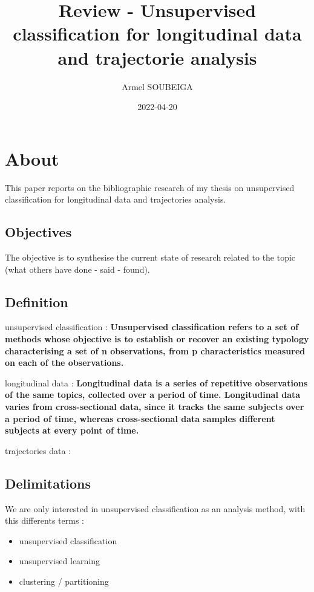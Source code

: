 \documentclass[
]{book}
\title{Review - Unsupervised classification for longitudinal data and trajectorie analysis}
\author{Armel SOUBEIGA}
\date{2022-04-20}
\begin{document}
\maketitle

{
\setcounter{tocdepth}{1}
\tableofcontents
}
\hypertarget{about}{%
\chapter*{About}\label{about}}

This paper reports on the bibliographic research of my thesis on unsupervised classification for longitudinal data and trajectories analysis.

\hypertarget{objectives}{%
\section{Objectives}\label{objectives}}

The objective is to synthesise the current state of research related to the topic (what others have done - said - found).

\hypertarget{definition}{%
\section{Definition}\label{definition}}

unsupervised classification : \textbf{Unsupervised classification refers to a set of methods whose objective is to establish or recover an existing typology characterising a set of n observations, from p characteristics measured on each of the observations.}

longitudinal data : \textbf{Longitudinal data is a series of repetitive observations of the same topics, collected over a period of time. Longitudinal data varies from cross-sectional data, since it tracks the same subjects over a period of time, whereas cross-sectional data samples different subjects at every point of time.}

trajectories data :

\hypertarget{delimitations}{%
\section{Delimitations}\label{delimitations}}

We are only interested in unsupervised classification as an analysis method, with this differents terms :

\begin{itemize}
\item
  unsupervised classification
\item
  unsupervised learning
\item
  clustering / partitioning
\end{itemize}
\end{document}
